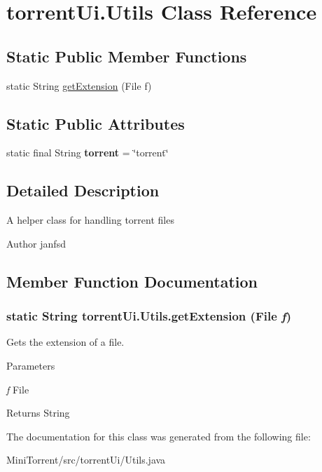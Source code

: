 \hypertarget{classtorrent_ui_1_1_utils}{
\section{torrentUi.Utils Class Reference}
\label{classtorrent_ui_1_1_utils}
}
\subsection*{Static Public Member Functions}
\begin{DoxyCompactItemize}
\item 
static String \hyperlink{classtorrent_ui_1_1_utils_a04ec9a47b540910364c70f60fd88ba3a}{getExtension} (File f)
\end{DoxyCompactItemize}
\subsection*{Static Public Attributes}
\begin{DoxyCompactItemize}
\item 
\hypertarget{classtorrent_ui_1_1_utils_a2d62c7fc4c57712260dbdea3574beeb5}{
static final String {\bfseries torrent} = \char`\"{}torrent\char`\"{}}
\label{classtorrent_ui_1_1_utils_a2d62c7fc4c57712260dbdea3574beeb5}

\end{DoxyCompactItemize}


\subsection{Detailed Description}
A helper class for handling torrent files \begin{DoxyAuthor}{Author}
janfsd 
\end{DoxyAuthor}


\subsection{Member Function Documentation}
\hypertarget{classtorrent_ui_1_1_utils_a04ec9a47b540910364c70f60fd88ba3a}{
\subsubsection[{getExtension}]{\setlength{\rightskip}{0pt plus 5cm}static String torrentUi.Utils.getExtension (File {\em f})}}
\label{classtorrent_ui_1_1_utils_a04ec9a47b540910364c70f60fd88ba3a}
Gets the extension of a file. 
\begin{DoxyParams}{Parameters}
\item[{\em f}]File \end{DoxyParams}
\begin{DoxyReturn}{Returns}
String 
\end{DoxyReturn}


The documentation for this class was generated from the following file:\begin{DoxyCompactItemize}
\item 
MiniTorrent/src/torrentUi/Utils.java\end{DoxyCompactItemize}
